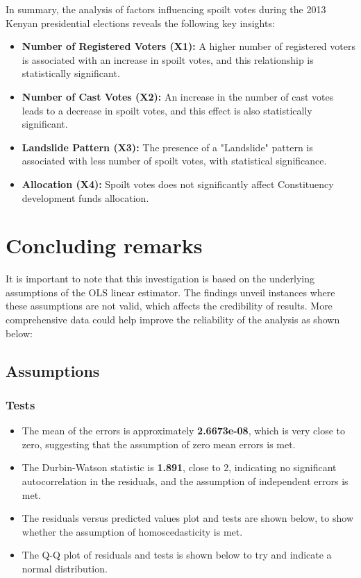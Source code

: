 \documentclass[fleqn,a4paper,12pt]{article}
\begin{document}
In summary, the analysis of factors influencing spoilt votes during the 2013 Kenyan presidential elections reveals the following key insights:

\begin{itemize}
  \item \textbf{Number of Registered Voters (X1):} A higher number of registered voters is associated with an increase in spoilt votes, and this relationship is statistically significant.

  \item \textbf{Number of Cast Votes (X2):} An increase in the number of cast votes leads to a decrease in spoilt votes, and this effect is also statistically significant.

  \item \textbf{Landslide Pattern (X3):} The presence of a "Landslide" pattern is associated with less number of spoilt votes, with statistical significance.

  \item \textbf{Allocation (X4):} Spoilt votes does not significantly affect Constituency development funds allocation.
\end{itemize}


 
\section{Concluding remarks}

It is important to note that this investigation is based on the underlying assumptions of the OLS linear estimator. The findings unveil instances where these assumptions are not valid, which affects the credibility of results. More comprehensive data could help improve the reliability of the analysis as shown below:
 

\subsection{Assumptions}
\subsubsection{Tests}
 
\begin{itemize}
\item The mean of the errors is approximately \textbf{2.6673e-08}, which is very close to zero, suggesting that the assumption of zero mean errors is met.
\item The Durbin-Watson statistic is \textbf{1.891}, close to 2, indicating no significant autocorrelation in the residuals, and the assumption of independent errors is met.
\item The residuals versus predicted values plot and tests are shown below, to show whether the assumption of homoscedasticity is met.
\item The  Q-Q plot of residuals and tests is shown below to try and indicate a normal distribution.
\end{itemize}
 
\end{document}
